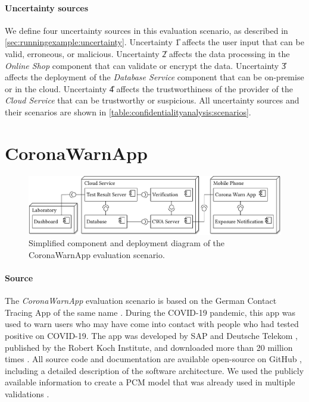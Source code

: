 \paragraph{Uncertainty sources}
We define four uncertainty sources in this evaluation scenario, as described in \autoref{sec:runningexample:uncertainty}.
Uncertainty \U{1} affects the user input that can be valid, erroneous, or malicious.
Uncertainty \U{2} affects the data processing in the \emph{Online Shop} component that can validate or encrypt the data.
Uncertainty \U{3} affects the deployment of the \emph{Database Service} component that can be on-premise or in the cloud. 
Uncertainty \U{4} affects the trustworthiness of the provider of the \emph{Cloud Service} that can be trustworthy or suspicious.
All uncertainty sources and their scenarios are shown in \autoref{table:confidentialityanalysis:scenarios}.





\section{CoronaWarnApp}%
\label{sec:evaluationscenarios:coronawarnapp}

\begin{figure}
    \centering
    \includegraphics[width=\textwidth]{figures/chapter8/scenario4_coronawarnapp.pdf}
    \caption{Simplified component and deployment diagram of the CoronaWarnApp evaluation scenario.}
    \label{fig:evaluationscenarios:coronawarnapp}
\end{figure}

\paragraph{Source}
The \emph{CoronaWarnApp} evaluation scenario is based on the German Contact Tracing App of the same name \cite{robert_koch_institute_open-source_2020}.
During the COVID-19 pandemic, this app was used to warn users who may have come into contact with people who had tested positive on COVID-19.
The app was developed by SAP and Deutsche Telekom \cite{enaya_case_2024}, published by the Robert Koch Institute, and downloaded more than 20 million times \cite{robert_koch_institute_open-source_2020}.
All source code and documentation are available open-source on GitHub \cite{sap_corona-warn-app_2023}, including a detailed description of the software architecture.
We used the publicly available information to create a \ac{PCM} model that was already used in multiple validations \cite{hahner_classification_2023,hahner_architecture-based_2023,hahner_architecture-based_2024}.

